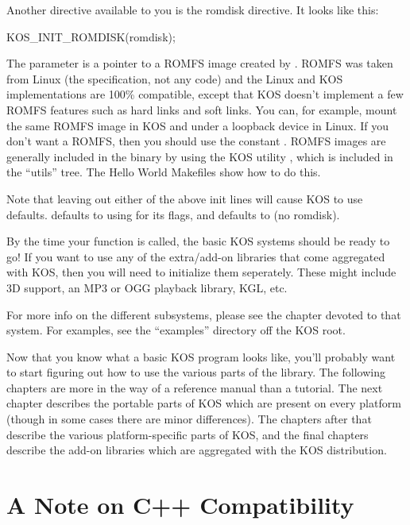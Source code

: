 \documentclass[english]{report}
\newenvironment{lyxcode}
   {\begin{list}{}{
     \setlength{\rightmargin}{\leftmargin}
     \raggedright
     \setlength{\itemsep}{0pt}
     \setlength{\parsep}{0pt}
     \normalfont\ttfamily}%
    \item[]}
   {\end{list}}
\begin{document}
Another directive available to you is the romdisk directive. It looks
like this:

\begin{lyxcode}
KOS\_INIT\_ROMDISK(romdisk);
\end{lyxcode}

The parameter is a pointer to a ROMFS image created by .
ROMFS was taken from Linux (the specification, not any code) and the
Linux and KOS implementations are 100\% compatible, except that KOS
doesn't implement a few ROMFS features such as hard links and soft
links. You can, for example, mount the same ROMFS image in KOS and
under a loopback device in Linux. If you don't want a ROMFS, then
you should use the constant . ROMFS images are
generally included in the binary by using the KOS utility ,
which is included in the {}``utils'' tree. The Hello World Makefiles
show how to do this.

Note that leaving out either of the above init lines will cause KOS
to use defaults.  defaults to using 
for its flags, and  defaults to  (no romdisk).

By the time your  function is called, the basic KOS systems
should be ready to go! If you want to use any of the extra/add-on
libraries that come aggregated with KOS, then you will need to initialize
them seperately. These might include 3D support, an MP3 or OGG playback
library, KGL, etc.

For more info on the different subsystems, please see the chapter
devoted to that system. For examples, see the ``examples'' directory
off the KOS root.

Now that you know what a basic KOS program looks like, you'll probably
want to start figuring out how to use the various parts of the library.
The following chapters are more in the way of a reference manual than
a tutorial. The next chapter describes the portable parts of KOS which
are present on every platform (though in some cases there are minor
differences). The chapters after that describe the various platform-specific
parts of KOS, and the final chapters describe the add-on libraries
which are aggregated with the KOS distribution.


\section{A Note on C++ Compatibility}
\end{document}
